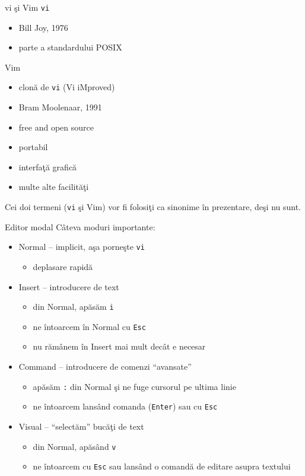 \documentclass{beamer}
\begin{document}
\begin{frame}{vi şi Vim}
 \texttt{vi}
\begin{itemize}
  \item<1-> Bill Joy, 1976
  \item<1-> parte a standardului POSIX
\end{itemize}

 Vim
\begin{itemize}
  \item<2-> clonă de \texttt{vi} (Vi iMproved)
  \item<2-> Bram Moolenaar, 1991
  \item<2-> free and open source
  \item<2-> portabil
  \item<2-> interfaţă grafică
  \item<2-> multe alte facilităţi
\end{itemize}

Cei doi termeni (\texttt{vi} şi Vim) vor fi folosiţi ca sinonime în
prezentare, deşi nu sunt.
\end{frame}

\begin{frame}{Editor modal}
Câteva moduri importante:
\begin{itemize}
  \item<1-> Normal -- implicit, aşa porneşte \texttt{vi}
    \begin{itemize}
    \item<1-> deplasare rapidă
    \end{itemize}
  \item<2-> Insert -- introducere de text
    \begin{itemize}
    \item<2-> din Normal, apăsăm \texttt{i}
    \item<2-> ne întoarcem în Normal cu \texttt{Esc}
    \item<2-> nu rămânem în Insert mai mult decât e necesar
    \end{itemize}
  \item<3-> Command -- introducere de comenzi ``avansate''
    \begin{itemize}
    \item<3-> apăsăm \texttt{:} din Normal şi ne fuge cursorul pe ultima linie
    \item<3-> ne întoarcem lansând comanda (\texttt{Enter}) sau cu
    \texttt{Esc}
    \end{itemize}
  \item<4-> Visual -- ``selectăm'' bucăţi de text
    \begin{itemize}
    \item<4-> din Normal, apăsând \texttt{v}
    \item<4-> ne întoarcem cu \texttt{Esc} sau lansând o comandă de editare
    asupra textului
    \end{itemize}
\end{itemize}
\end{frame}
\end{document}
